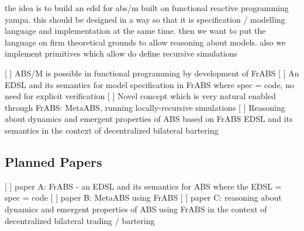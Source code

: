 the idea is to build an edsl for abs/m built on functional reactive programming yampa. this should be designed in a way so that it is specification / modelling language and implementation at the same time. then we want to put the language on firm theoretical grounds to allow reasoning about models. also we implement primitives which allow do define recursive simulations

[ ] ABS/M is possible in functional programming by development of FrABS
[ ] An EDSL and its semantics for model specification in FrABS where spec = code,  no need for explicit verification
[ ] Novel concept which is very natural enabled through FrABS: MetaABS, running locally-recursive simulations
[ ] Reasoning about  dynamics and emergent properties of ABS based on FrABS EDSL and its semantics in the context of decentralized bilateral bartering

\subsection{Planned Papers}
[ ] paper A: FrABS - an EDSL and its semantics for ABS where the EDSL = spec = code
[ ] paper B: MetaABS using FrABS
[ ] paper C: reasoning about dynamics and emergent properties of ABS using FrABS in the context of decentralized bilateral trading / bartering